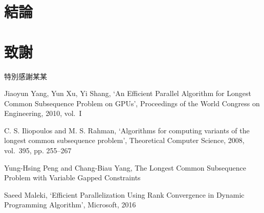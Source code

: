 \documentclass{gapd}
\begin{document}
\section{結論}
\label{sec:Conclusion}

\section*{致謝}

特別感謝某某

\begin{thebibliography}{4}

 Jiaoyun Yang, Yun Xu, Yi Shang, `An Efficient Parallel Algorithm for Longest Common Subsequence Problem on GPUs', Proceedings of the World Congress on Engineering, 2010, vol.~I 

 C. S. Iliopoulos and M. S. Rahman, `Algorithms for computing variants of the longest common subsequence problem', Theoretical Computer Science, 2008, vol.~395, pp. 255--267

 Yung-Hsing Peng and Chang-Biau Yang, The Longest Common Subsequence Problem with Variable Gapped Constraints

 Saeed Maleki, `Efficient Parallelization Using Rank Convergence in Dynamic Programming Algorithm', Microsoft, 2016

\end{thebibliography}

\end{document}
